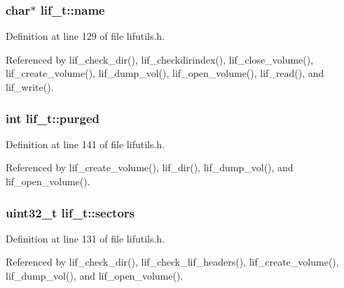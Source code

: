 \subsubsection[{\texorpdfstring{name}{name}}]{\setlength{\rightskip}{0pt plus 5cm}char$\ast$ lif\+\_\+t\+::name}\hypertarget{structlif__t_ae6b943f3c26005fc375169960e9049f7}{}\label{structlif__t_ae6b943f3c26005fc375169960e9049f7}


Definition at line 129 of file lifutils.\+h.



Referenced by lif\+\_\+check\+\_\+dir(), lif\+\_\+checkdirindex(), lif\+\_\+close\+\_\+volume(), lif\+\_\+create\+\_\+volume(), lif\+\_\+dump\+\_\+vol(), lif\+\_\+open\+\_\+volume(), lif\+\_\+read(), and lif\+\_\+write().

\subsubsection[{\texorpdfstring{purged}{purged}}]{\setlength{\rightskip}{0pt plus 5cm}int lif\+\_\+t\+::purged}\hypertarget{structlif__t_a1dfef3ca99d6ba9680bb9b6bf8fafc32}{}\label{structlif__t_a1dfef3ca99d6ba9680bb9b6bf8fafc32}


Definition at line 141 of file lifutils.\+h.



Referenced by lif\+\_\+create\+\_\+volume(), lif\+\_\+dir(), lif\+\_\+dump\+\_\+vol(), and lif\+\_\+open\+\_\+volume().

\subsubsection[{\texorpdfstring{sectors}{sectors}}]{\setlength{\rightskip}{0pt plus 5cm}uint32\+\_\+t lif\+\_\+t\+::sectors}\hypertarget{structlif__t_a262b14d8547abff49d9dd1b445faf6d5}{}\label{structlif__t_a262b14d8547abff49d9dd1b445faf6d5}


Definition at line 131 of file lifutils.\+h.



Referenced by lif\+\_\+check\+\_\+dir(), lif\+\_\+check\+\_\+lif\+\_\+headers(), lif\+\_\+create\+\_\+volume(), lif\+\_\+dump\+\_\+vol(), and lif\+\_\+open\+\_\+volume().

